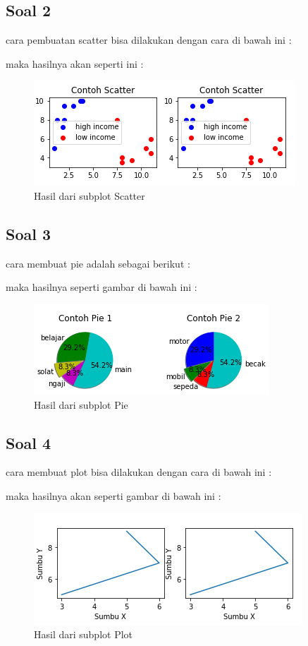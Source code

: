 \subsection{Soal 2}
cara pembuatan scatter bisa dilakukan dengan cara di bawah ini :

maka hasilnya akan seperti ini :
\begin{figure}[h]
\centering
\includegraphics[scale=0.9]{figures/6/Praktek/1174095/scdz.png}
\caption{Hasil dari subplot Scatter}
\label{fig:contoh}
\end{figure}


\subsection{Soal 3}
cara membuat pie adalah sebagai berikut :

maka hasilnya seperti gambar di bawah ini :
\begin{figure}[h]
\centering
\includegraphics[scale=1.2]{figures/6/Praktek/1174095/piedz.png}
\caption{Hasil dari subplot Pie}
\label{fig:contoh}
\end{figure}


\subsection{Soal 4}
cara membuat plot bisa dilakukan dengan cara di bawah ini :

maka hasilnya akan seperti gambar di bawah ini :
\begin{figure}[h]
\centering
\includegraphics[scale=0.9]{figures/6/Praktek/1174095/pltdz.png}
\caption{Hasil dari subplot Plot}
\label{fig:contoh}
\end{figure}


